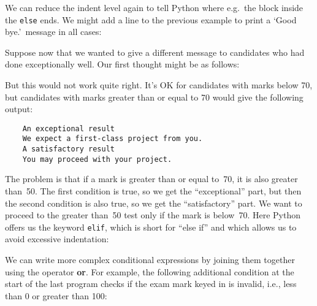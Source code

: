 We can reduce the indent level again to tell Python where e.g.\
the block inside the \verb!else! ends. We might add
a line to the previous example to print a `Good bye.'\ message
in all cases:






Suppose now that we wanted to give a different message to candidates who
had done exceptionally well. Our first thought might be as follows:


But this would not work quite right.  It's OK for candidates with
marks below 70,
but candidates with marks greater than or equal to 70 
would give the following output:

\begin{Verbatim}
    An exceptional result
    We expect a first-class project from you.
    A satisfactory result
    You may proceed with your project.
\end{Verbatim}

The problem is that if a mark is greater than or equal to~70, it is
also greater than~50.  The first
condition is true, so we get the ``exceptional'' part, but then the second
condition is also true, so we get the ``satisfactory'' part.  We want to
proceed to the greater than~50 test only if the mark is below~70.
Here Python offers us the keyword \verb!elif!, which is short for
``else if'' and which allows us to avoid excessive indentation:


We can write more complex conditional expressions by joining them together
using the operator \textbf{or}.  For example, the following additional
condition at the start of the last program checks if the exam mark keyed in
is invalid, i.e., less than 0 or greater than 100:



